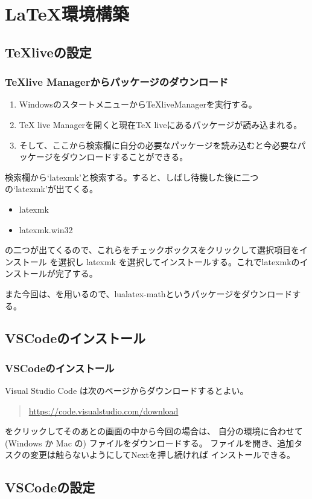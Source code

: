 \documentclass{beamer}
\begin{document}
\section{\LaTeX 環境構築}
\subsection{TeXliveの設定}
\begin{frame}
  \frametitle{TeXlive Managerからパッケージのダウンロード}
  \begin{enumerate}
    \item WindowsのスタートメニューからTeXliveManagerを実行する。
    \item TeX live Managerを開くと現在TeX liveにあるパッケージが読み込まれる。
    \item そして、ここから検索欄に自分の必要なパッケージを読み込むと今必要なパッケージをダウンロードすることができる。
  \end{enumerate}
 検索欄から`latexmk'と検索する。すると、しばし待機した後に二つの`latexmk'が出てくる。
\begin{itemize}
  \item latexmk
  \item latexmk.win32
\end{itemize}
の二つが出てくるので、これらをチェックボックスをクリックして選択項目をインストール を選択し latexmk を選択してインストールする。これでlatexmkのインストールが完了する。

また今回は、\LuaLaTeX を用いるので、lualatex-mathというパッケージをダウンロードする。
\end{frame}

\subsection{VSCodeのインストール}
\begin{frame}
  \frametitle{VSCodeのインストール}

  Visual Studio Code は次のページからダウンロードするとよい。
\begin{quote}
	\url{https://code.visualstudio.com/download}
\end{quote}
をクリックしてそのあとの画面の中から今回の場合は、
自分の環境に合わせて (Windows か Mac の) ファイルをダウンロードする。
ファイルを開き、追加タスクの変更は触らないようにしてNextを押し続ければ
インストールできる。


\end{frame}

\subsection{VSCodeの設定}
\end{document}
